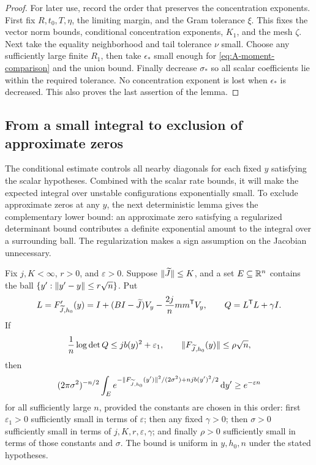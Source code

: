 \begin{proof}
For later use, record the order that preserves the concentration
exponents. First fix $R,t_0,T,\eta$,
the limiting margin, and the Gram tolerance $\xi$.  This fixes the
vector norm bounds, conditional concentration exponents, $K_1$, and
the mesh $\zeta$.  Next take the equality neighborhood and tail
tolerance $\nu$ small.  Choose any sufficiently large finite $R_1$,
then take $\epsilon_*$ small enough for
\eqref{eq:A-moment-comparison} and the union bound.  Finally decrease
$\sigma_*$ so all scalar coefficients lie within the required
tolerance.  No concentration exponent is lost when $\epsilon_*$ is
decreased. This also proves the last assertion of the lemma.
\end{proof}

\subsection{From a small integral to exclusion of approximate zeros}

The conditional estimate controls all nearby diagonals for each fixed
$y$ satisfying the scalar hypotheses. Combined with the scalar rate
bounds, it will make the expected integral over unstable configurations
exponentially small. To exclude approximate zeros at any $y$, the next
deterministic lemma gives the complementary lower bound: an approximate
zero satisfying a regularized determinant bound contributes a definite
exponential amount to the integral over a surrounding ball. The
regularization makes a sign assumption on the Jacobian unnecessary.

\begin{lemma}
\label{lem:local-field-volume}
Fix $j,K<\infty$, $r>0$, and $\varepsilon>0$.  Suppose
$\lVert \widetilde J\rVert\le K$, and a set $E\subseteq\mathbb R^n$ contains the ball
$\{y':\lVert y'-y\rVert\le r\sqrt n\}$.  Put
\[
 L=F'_{\widetilde J,h_0}(y)
 =I+(BI-\widetilde J)V_y-\frac{2j}{n}mm^{\mathsf T}V_y,\qquad
 Q=L^{\mathsf T}L+\gamma I.
\]
If
\begin{equation}
 \frac1n\log\det Q\le jb(y)^2+\varepsilon_1,\qquad
 \lVert F_{\widetilde J,h_0}(y)\rVert\le\rho\sqrt n,
 \label{eq:local-volume-hypotheses}
\end{equation}
then
\begin{equation}
 (2\pi\sigma^2)^{-n/2}\int_E
 e^{-\lVert F_{\widetilde J,h_0}(y')\rVert^2/(2\sigma^2)+njb(y')^2/2}\,\mathrm d y'
 \ge e^{-\varepsilon n}
 \label{eq:local-volume-conclusion}
\end{equation}
for all sufficiently large $n$, provided the constants are chosen in
this order: first $\varepsilon_1>0$ sufficiently small in terms of
$\varepsilon$; then any fixed $\gamma>0$; then $\sigma>0$
sufficiently small in terms of $j,K,r,\varepsilon,\gamma$; and finally
$\rho>0$ sufficiently small in terms of those constants and $\sigma$.
The bound is uniform in $y,h_0,n$ under the stated hypotheses.
\end{lemma}

